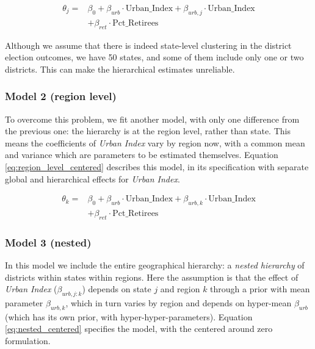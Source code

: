 \documentclass[12pt]{article}
\begin{document}
\begin{equation} \label{eq:state_level_centered}
	\begin{aligned}
		\theta_{j} =    &\beta_0 + \beta_{urb} \cdot \text{Urban\_Index} + \beta_{urb,j} \cdot \text{Urban\_Index} \\
		&+ \beta_{ret} \cdot \text{Pct\_Retirees}
	\end{aligned}
\end{equation}


Although we assume that there is indeed state-level clustering in the district election outcomes, we have 50 states, and some of them include only one or two districts. This can make the hierarchical estimates unreliable. 


\subsubsection*{Model 2 (region level)}


To overcome this problem, we fit another model, with only one difference from the previous one: the hierarchy is at the region level, rather than state. This means the coefficients of \textit{Urban Index} vary by region now, with a common mean and variance which are parameters to be estimated themselves.
Equation \ref{eq:region_level_centered} describes this model, in its specification with separate global and hierarchical effects for \textit{Urban Index}.


\begin{equation} \label{eq:region_level_centered}
	\begin{aligned}
		\theta_{k} =    &\beta_0 + \beta_{urb} \cdot \text{Urban\_Index} + \beta_{urb,k} \cdot \text{Urban\_Index} \\
		&+ \beta_{ret} \cdot \text{Pct\_Retirees}
	\end{aligned}
\end{equation}


\subsubsection*{Model 3 (nested)}


In this model we include the entire geographical hierarchy: a \textit{nested hierarchy} of districts within states within regions.
Here the assumption is that the effect of \textit{Urban Index} ($\beta_{urb, j:k}$) depends on state $j$ and region $k$ through a prior with mean parameter $\beta_{urb, k}$, which in turn varies by region and depends on hyper-mean $\beta_{urb}$ (which has its own prior, with hyper-hyper-parameters). Equation \ref{eq:nested_centered} specifies the model, with the centered around zero formulation. 
\end{document}

